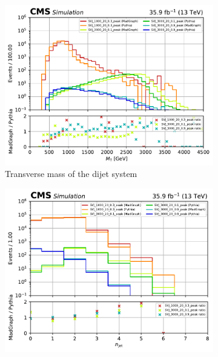 \begin{figure}[htbp]
    \centering
    \begin{subfigure}[b]{0.45\textwidth}
        \includegraphics[width=\textwidth]{figures/madgraph_pythia_comparisons/with_ratios/part1/dijet_mt.pdf}
        \caption{Transverse mass of the dijet system}
    \end{subfigure}
    \hfill
    \begin{subfigure}[b]{0.45\textwidth}
        \includegraphics[width=\textwidth]{figures/madgraph_pythia_comparisons/with_ratios/part1/njet.pdf}
        \caption{\njet}
    \end{subfigure}


\end{figure}
